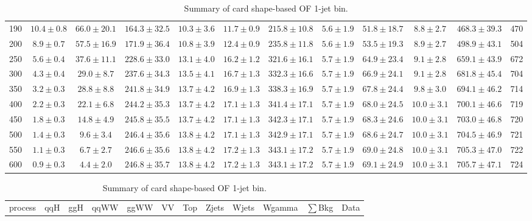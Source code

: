 \begin{table}
{\begin{center}
\begin{tabular}{l | c c | c c c c c c c | c c}
190 & $10.4\pm0.8$ & $66.0\pm20.1$ & $164.3\pm32.5$ & $10.3\pm3.6$ & $11.7\pm0.9$ & $215.8\pm10.8$ & $5.6\pm1.9$ & $51.8\pm18.7$ & $8.8\pm2.7$ & $468.3\pm39.3$ & 470 \\
200 & $8.9\pm0.7$ & $57.5\pm16.9$ & $171.9\pm36.4$ & $10.8\pm3.9$ & $12.4\pm0.9$ & $235.8\pm11.8$ & $5.6\pm1.9$ & $53.5\pm19.3$ & $8.9\pm2.7$ & $498.9\pm43.1$ & 504 \\
250 & $5.6\pm0.4$ & $37.6\pm11.1$ & $228.6\pm33.0$ & $13.1\pm4.0$ & $16.2\pm1.2$ & $321.6\pm16.1$ & $5.7\pm1.9$ & $64.9\pm23.4$ & $9.1\pm2.8$ & $659.1\pm43.9$ & 672 \\
300 & $4.3\pm0.4$ & $29.0\pm8.7$ & $237.6\pm34.3$ & $13.5\pm4.1$ & $16.7\pm1.3$ & $332.3\pm16.6$ & $5.7\pm1.9$ & $66.9\pm24.1$ & $9.1\pm2.8$ & $681.8\pm45.4$ & 704 \\
350 & $3.2\pm0.3$ & $28.8\pm8.8$ & $241.8\pm34.9$ & $13.7\pm4.2$ & $16.9\pm1.3$ & $338.3\pm16.9$ & $5.7\pm1.9$ & $67.8\pm24.4$ & $9.8\pm3.0$ & $694.1\pm46.2$ & 714 \\
400 & $2.2\pm0.3$ & $22.1\pm6.8$ & $244.2\pm35.3$ & $13.7\pm4.2$ & $17.1\pm1.3$ & $341.4\pm17.1$ & $5.7\pm1.9$ & $68.0\pm24.5$ & $10.0\pm3.1$ & $700.1\pm46.6$ & 719 \\
450 & $1.8\pm0.3$ & $14.8\pm4.9$ & $245.8\pm35.5$ & $13.7\pm4.2$ & $17.1\pm1.3$ & $342.3\pm17.1$ & $5.7\pm1.9$ & $68.3\pm24.6$ & $10.0\pm3.1$ & $703.0\pm46.8$ & 720 \\
500 & $1.4\pm0.3$ & $9.6\pm3.4$ & $246.4\pm35.6$ & $13.8\pm4.2$ & $17.1\pm1.3$ & $342.9\pm17.1$ & $5.7\pm1.9$ & $68.6\pm24.7$ & $10.0\pm3.1$ & $704.5\pm46.9$ & 721 \\
550 & $1.1\pm0.3$ & $6.7\pm2.7$ & $246.6\pm35.6$ & $13.8\pm4.2$ & $17.2\pm1.3$ & $343.1\pm17.2$ & $5.7\pm1.9$ & $69.0\pm24.8$ & $10.0\pm3.1$ & $705.3\pm47.0$ & 722 \\
600 & $0.9\pm0.3$ & $4.4\pm2.0$ & $246.8\pm35.7$ & $13.8\pm4.2$ & $17.2\pm1.3$ & $343.1\pm17.2$ & $5.7\pm1.9$ & $69.1\pm24.9$ & $10.0\pm3.1$ & $705.7\pm47.1$ & 724 \\
\hline
\end{tabular}
\end{center}
}
\caption{Summary of card shape-based OF 1-jet bin.}
{%
 \tiny
 \begin{center}
 \begin{tabular}{l | c c | c c c c c c c | c c}
 \hline
 process & qqH & ggH & qqWW & ggWW & VV & Top & Zjets & Wjets & Wgamma & $\sum$Bkg & Data \\

\end{tabular}
\end{center}}
\end{table}
